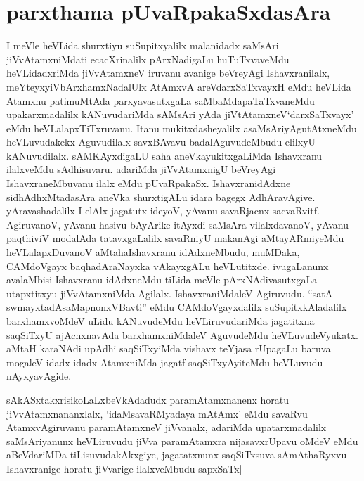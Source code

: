 \section*{parxthama pUvaRpakaSxdasAra}

\begin{artha}
I meVle heVLida shurxtiyu suSupitxyalilx malanidadx saMsAri
jiVvAtamxniMdati ecacXrinalilx pArxNadigaLu huTuTxvaveMdu
heVLidadxriMda jiVvAtamxneV iruvanu avanige beVreyAgi Ishavxranilalx,
meYteyxyiVbArxhamxNadalUlx AtAmxvA areVdarxSaTxvayxH eMdu heVLida
Atamxnu patimuMtAda parxyavasutxgaLa saMbaMdapaTaTxvaneMdu
upakarxmadalilx kANuvudariMda sAMsAri yAda jiVtAtamxneV`darxSaTxvayx'
eMdu heVLalapxTiTxruvanu. Itanu mukitxdasheyalilx
asaMsAriyAgutAtxneMdu heVLuvudakekx Aguvudilalx savxBAvavu
badalAguvudeMbudu elilxyU kANuvudilalx. sAMKAyxdigaLU saha
aneVkayukitxgaLiMda Ishavxranu ilalxveMdu sAdhisuvaru. adariMda
jiVvAtamxnigU beVreyAgi IshavxraneMbuvanu ilalx eMdu
pUvaRpakaSx. IshavxranidAdxne sidhAdhxMtadasAra aneVka shurxtigALu
idara bagegx  AdhAravAgive. yAravashadalilx I elAlx jagatutx ideyoV,
yAvanu savaRjacnx sacvaRvitf. AgiruvanoV, yAvanu hasivu bAyArike
itAyxdi saMsAra vilalxdavanoV, yAvanu paqthiviV modalAda
tatavxgaLalilx savaRniyU makanAgi aMtayARmiyeMdu heVLalapxDuvanoV
aMtahaIshavxranu idAdxneMbudu, muMDaka, CAMdoVgayx baqhadAraNayxka
vAkayxgALu heVLutitxde. ivugaLanunx avalaMbisi Ishavxranu idAdxneMdu
tiLida meVle pArxNAdivasutxgaLa utapxtitxyu jiVvAtamxniMda
Agilalx. IshavxraniMdaleV Agiruvudu. ``satA
swmayxtadAsaMapnonxVBavti'' eMdu CAMdoVgayxdalilx suSupitxkAladalilx
barxhamxvoMdeV uLidu kANuvudeMdu heVLiruvudariMda jagatitxna saqSiTxyU
ajAcnxnavAda barxhamxniMdaleV AguvudeMdu heVLuvudeVyukatx. aMtaH
karaNAdi upAdhi saqSiTxyiMda vishavx teYjasa rUpagaLu baruva mogaleV
idadx idadx AtamxniMda jagatf saqSiTxyAyiteMdu heVLuvudu nAyxyavAgide.
\end{artha}


\begin{artha}
sAkASxtakxrisikoLaLxbeVkAdadudx paramAtamxnanenx horatu
jiVvAtamxnananxlalx, `idaMsavaRMyadaya mAtAmx' eMdu savaRvu
AtamxvAgiruvanu paramAtamxneV jiVvanalx, adariMda upatarxmadalilx
saMsAriyanunx heVLiruvudu jiVva paramAtamxra nijasavxrUpavu oMdeV eMdu
aBeVdariMDa tiLisuvudakAkxgiye, jagatatxnunx saqSiTxsuva sAmAthaRyxvu
Ishavxranige horatu jiVvarige ilalxveMbudu sapxSaTx|
\end{artha}



